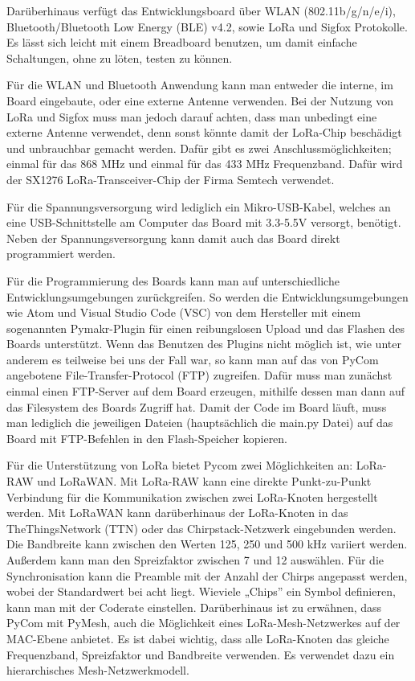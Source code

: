 Darüberhinaus verfügt das Entwicklungsboard über WLAN (802.11b/g/n/e/i), Bluetooth/Bluetooth Low Energy (BLE) v4.2, sowie LoRa und Sigfox Protokolle.  
Es lässt sich leicht mit einem Breadboard benutzen, um damit einfache Schaltungen, ohne zu löten, testen zu können. 

Für die WLAN und Bluetooth Anwendung kann man entweder die interne, im Board eingebaute, oder eine externe Antenne verwenden. Bei der Nutzung von LoRa und Sigfox muss man jedoch darauf achten, dass man unbedingt eine externe Antenne verwendet, denn sonst könnte damit der LoRa-Chip beschädigt und unbrauchbar gemacht werden. Dafür gibt es zwei Anschlussmöglichkeiten; einmal für das 868 MHz und einmal für das 433 MHz Frequenzband. 
Dafür wird der SX1276 LoRa-Transceiver-Chip der Firma Semtech verwendet.

Für die Spannungsversorgung wird lediglich ein Mikro-USB-Kabel, welches an eine USB-Schnittstelle am Computer das Board mit 3.3-5.5V versorgt, benötigt. Neben der Spannungsversorgung kann damit auch das Board direkt programmiert werden. 

Für die Programmierung des Boards kann man auf unterschiedliche Entwicklungsumgebungen zurückgreifen. So werden die Entwicklungsumgebungen wie Atom und Visual Studio Code (VSC) von dem Hersteller mit einem sogenannten Pymakr-Plugin für einen reibungslosen Upload und das Flashen des Boards unterstützt. Wenn das Benutzen des Plugins nicht möglich ist, wie unter anderem es teilweise bei uns der Fall war, so kann man auf das von PyCom angebotene File-Transfer-Protocol (FTP) zugreifen. Dafür muss man zunächst einmal einen FTP-Server auf dem Board erzeugen, mithilfe dessen man dann auf das Filesystem des Boards Zugriff hat. Damit der Code im Board läuft, muss man lediglich die jeweiligen Dateien (hauptsächlich die main.py Datei) auf das Board mit FTP-Befehlen in den Flash-Speicher kopieren. 

Für die Unterstützung von LoRa bietet Pycom zwei Möglichkeiten an: LoRa-RAW und LoRaWAN. 
Mit LoRa-RAW kann eine direkte Punkt-zu-Punkt Verbindung für die Kommunikation zwischen zwei LoRa-Knoten hergestellt werden. Mit LoRaWAN kann darüberhinaus der LoRa-Knoten in das TheThingsNetwork (TTN) oder das Chirpstack-Netzwerk eingebunden werden. Die Bandbreite kann zwischen den Werten 125, 250 und 500 kHz variiert werden. Außerdem kann man den Spreizfaktor zwischen 7 und 12 auswählen. Für die Synchronisation kann die Preamble mit der Anzahl der Chirps angepasst werden, wobei der Standardwert bei acht liegt. Wieviele „Chips” ein Symbol definieren, kann man mit der Coderate einstellen.
Darüberhinaus ist zu erwähnen, dass PyCom mit PyMesh, auch die Möglichkeit eines LoRa-Mesh-Netzwerkes auf der MAC-Ebene anbietet. Es ist dabei wichtig, dass alle LoRa-Knoten das gleiche Frequenzband, Spreizfaktor und Bandbreite verwenden. Es verwendet dazu ein hierarchisches Mesh-Netzwerkmodell.

